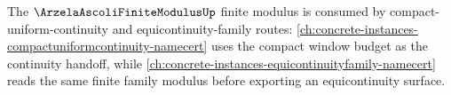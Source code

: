 The $\ArzelaAscoliFiniteModulusUp$ finite modulus is consumed by compact-uniform-continuity and equicontinuity-family routes: \autoref{ch:concrete-instances-compactuniformcontinuity-namecert} uses the compact window budget as the continuity handoff, while \autoref{ch:concrete-instances-equicontinuityfamily-namecert} reads the same finite family modulus before exporting an equicontinuity surface.
